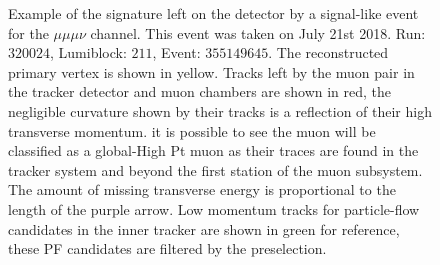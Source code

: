 \begin{figure}
  \centering
  \vfil
  \caption{Example of the signature left on the detector by a signal-like event
    for the $\mu\mu\mu\nu$ channel. This event was taken on July 21st 2018.
    Run: $320024$, Lumiblock: $211$, Event: $355149645$. The reconstructed primary vertex is shown in yellow.
    Tracks left by the muon pair in the tracker detector and muon chambers are shown in red,
    the negligible curvature shown by their tracks is a reflection of their high transverse momentum.
    it is possible to see the muon will be classified as a global-High Pt muon as their traces
    are found in the tracker system and beyond the first station of the muon subsystem.
    The amount of missing
    transverse energy is proportional to the length of the purple arrow. Low momentum
    tracks for particle-flow candidates in the inner tracker are shown in green for
    reference, these PF candidates are filtered by the preselection. }
  \label{fig:Fireworks_mumumuv}
\end{figure}






